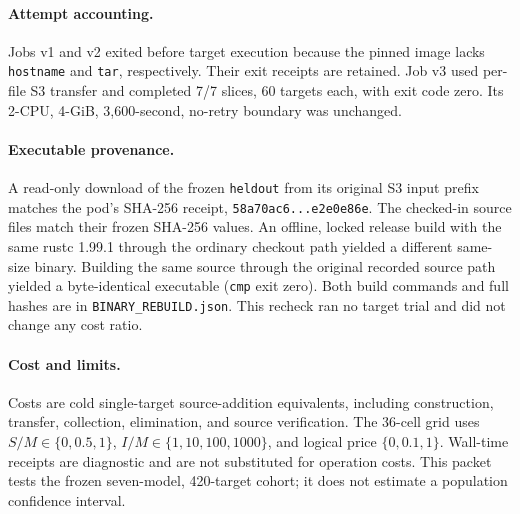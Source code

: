 \documentclass[10pt]{article}
\begin{document}
\paragraph{Attempt accounting.} Jobs v1 and v2 exited before target execution because the pinned image lacks \texttt{hostname} and \texttt{tar}, respectively. Their exit receipts are retained. Job v3 used per-file S3 transfer and completed 7/7 slices, 60 targets each, with exit code zero. Its 2-CPU, 4-GiB, 3,600-second, no-retry boundary was unchanged.

\paragraph{Executable provenance.} A read-only download of the frozen
\texttt{heldout} from its original S3 input prefix matches the pod's
SHA-256 receipt, \texttt{58a70ac6...e2e0e86e}. The checked-in source files
match their frozen SHA-256 values. An offline, locked release build with the
same rustc 1.99.1 through the ordinary checkout path yielded a different
same-size binary. Building the same source through the original recorded
source path yielded a byte-identical
executable (\texttt{cmp} exit zero). Both build commands and full hashes are
in \texttt{BINARY\_REBUILD.json}. This recheck ran no target trial and did
not change any cost ratio.

\paragraph{Cost and limits.} Costs are cold single-target source-addition equivalents, including construction, transfer, collection, elimination, and source verification. The 36-cell grid uses $S/M\in\{0,0.5,1\}$, $I/M\in\{1,10,100,1000\}$, and logical price $\{0,0.1,1\}$. Wall-time receipts are diagnostic and are not substituted for operation costs. This packet tests the frozen seven-model, 420-target cohort; it does not estimate a population confidence interval.
\end{document}
